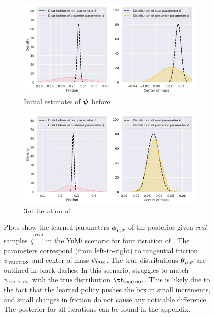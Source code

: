 \begin{figure}
\centering
\captionsetup{size=footnotesize}
\begin{subfigure}{\textwidth}
  \includegraphics[width=\textwidth]{img/yumi/latent-representation/yumi_latent_encoding_0_iter}%
  \caption{Initial estimates of $\boldsymbol{\psi}$ before \dettostoc{}}
\end{subfigure}
\begin{subfigure}{\textwidth}
  \centering
  \includegraphics[width=\linewidth]{img/yumi/latent-representation/yumi_latent_encoding_3_iter}
  \caption{3rd iteration of \dettostoc{}}
\end{subfigure}
\caption{Plots show the learned parameters $\boldsymbol{\phi}_{\mu, \sigma}$ of the posterior given \emph{real} samples $\vec{\xi}^{real}$ in the YuMi scenario for four iteration of \dettostoc{}.
The parameters correspond (from left-to-right) to tangential friction $\psi_{\textsc{friction}}$ and center of mass $\psi_{\textsc{com}}$. The true distributions $\boldsymbol{\theta}_{\mu, \sigma}$ are outlined in black dashes. In this scenario, \dettostoc{} struggles to match $\psi_{\textsc{friction}}{}$ with the true distribution $\th_\textsc{friction}$. This is likely due to the fact that the learned policy pushes the box in small increments, and small changes in friction do not cause any noticable difference. The posterior for all iterations can be found in the appendix.}
\label{fig:yumi/latentspace}
\end{figure}